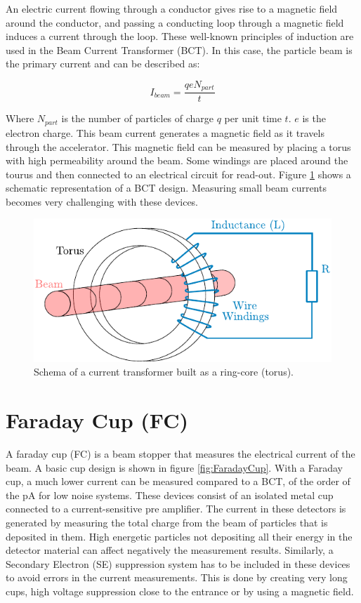 An electric current flowing through a conductor gives rise to a magnetic field around the conductor, and passing a conducting loop through a magnetic field induces a current through the loop. These well-known principles of induction are used in the Beam Current Transformer (BCT). In this case, the particle beam is the primary current and can be described as: 

\begin{equation}
    I_{beam} = \frac{q e N_{part}}{t}
\end{equation}

Where $N_{part}$ is the number of particles of charge $q$ per unit time $t$. $e$ is the electron charge. This beam current generates a magnetic field as it travels through the accelerator. This magnetic field can be measured by placing a torus with high permeability around the beam. Some windings are placed around the tourus and then connected to an electrical circuit for read-out. Figure \ref{fig:BCTschema} shows a schematic representation of a BCT design. Measuring small beam currents becomes very challenging with these devices.

\begin{figure}[h]
    \centering
    \includegraphics[width=0.6\columnwidth]{BCTschema/BCTschema.pdf}
    \caption{Schema of a current transformer built as a ring-core (torus). }
    \label{fig:BCTschema}
\end{figure}

\section{Faraday Cup (FC)}
\label{sec:FC}

A faraday cup (FC) is a beam stopper that measures the electrical current of the beam. A basic cup design is shown in figure \ref{fig:FaradayCup}. With a Faraday cup, a much lower current can be measured compared to a BCT, of the order of the \si[]{\pico \ampere} for low noise systems. These devices consist of an isolated metal cup connected to a current-sensitive pre amplifier. The current in these detectors is generated by measuring the total charge from the beam of particles that is deposited in them. High energetic particles not depositing all their energy in the detector material can affect negatively the measurement results. Similarly, a Secondary Electron (SE) suppression system has to be included in these devices to avoid errors in the current measurements. This is done by creating very long cups, high voltage suppression close to the entrance or by using a magnetic field. 

